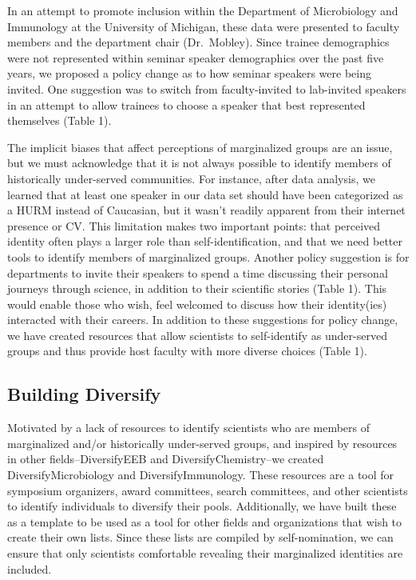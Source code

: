 \documentclass[10pt,]{article}
\begin{document}
In an attempt to promote inclusion within the Department of Microbiology
and Immunology at the University of Michigan, these data were presented
to faculty members and the department chair (Dr.~Mobley). Since trainee
demographics were not represented within seminar speaker demographics
over the past five years, we proposed a policy change as to how seminar
speakers were being invited. One suggestion was to switch from
faculty-invited to lab-invited speakers in an attempt to allow trainees
to choose a speaker that best represented themselves (Table 1).

The implicit biases that affect perceptions of marginalized groups are
an issue, but we must acknowledge that it is not always possible to
identify members of historically under-served communities. For instance,
after data analysis, we learned that at least one speaker in our data
set should have been categorized as a HURM instead of Caucasian, but it
wasn't readily apparent from their internet presence or CV. This
limitation makes two important points: that perceived identity often
plays a larger role than self-identification, and that we need better
tools to identify members of marginalized groups. Another policy
suggestion is for departments to invite their speakers to spend a time
discussing their personal journeys through science, in addition to their
scientific stories (Table 1). This would enable those who wish, feel
welcomed to discuss how their identity(ies) interacted with their
careers. In addition to these suggestions for policy change, we have
created resources that allow scientists to self-identify as under-served
groups and thus provide host faculty with more diverse choices (Table
1).

\subsection{Building Diversify}\label{building-diversify}

Motivated by a lack of resources to identify scientists who are members
of marginalized and/or historically under-served groups, and inspired by
resources in other fields--DiversifyEEB and DiversifyChemistry--we
created DiversifyMicrobiology and DiversifyImmunology. These resources
are a tool for symposium organizers, award committees, search
committees, and other scientists to identify individuals to diversify
their pools. Additionally, we have built these as a template to be used
as a tool for other fields and organizations that wish to create their
own lists. Since these lists are compiled by self-nomination, we can
ensure that only scientists comfortable revealing their marginalized
identities are included.
\end{document}
